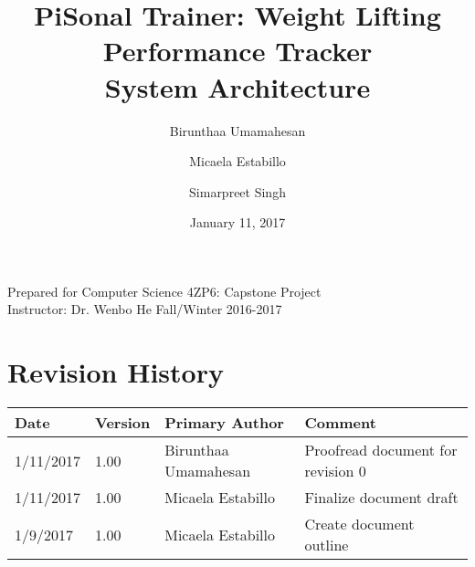 \documentclass{article}
\title{
PiSonal Trainer: Weight Lifting Performance Tracker\\
\Large {System Architecture}
}
\date{January 11, 2017}
\author{Birunthaa Umamahesan \and Micaela Estabillo \and Simarpreet Singh}
\begin{document}
\thispagestyle{plain}
\maketitle
\vfill
\begin{center}
    Prepared for Computer Science 4ZP6: Capstone Project \\
    Instructor: Dr. Wenbo He
    Fall/Winter 2016-2017\\
\end{center}
\newpage

\tableofcontents

\listoffigures

\listoftables

\thispagestyle{plain}

\newpage

\section*{Revision History}
\begingroup
\begin{tabular}{ | p{2cm} | p{1.5cm} | p{3.8cm} | p{7cm} |} 
    \hline
    \textbf{Date} & \textbf{Version} & \textbf{Primary Author} & \textbf{Comment}\\
    \hline
    1/11/2017 & 1.00 & Birunthaa Umamahesan & Proofread document for revision 0\\
    \hline
    1/11/2017 & 1.00 & Micaela Estabillo & Finalize document draft\\
    \hline
    1/9/2017 & 1.00 & Micaela Estabillo & Create document outline\\
    \hline
\end{tabular}
\endgroup


\begin{center}
\end{center}

\newpage

\clearpage
\setcounter{page}{1}

% 
\end{document}
